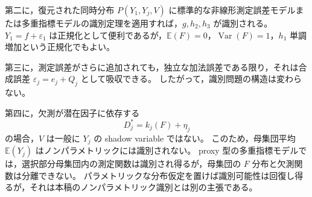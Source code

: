 \documentclass[dvipdfmx,autodetect-engine]{jsarticle}
\newcommand{\E}{\mathbb{E}}
\newcommand{\1}{\mathbf{1}}
\begin{document}
第二に，復元された同時分布 $P(Y_1,Y_j,V)$ に標準的な非線形測定誤差モデルまたは多重指標モデルの識別定理を適用すれば，$g,h_2,h_3$ が識別される。
$Y_1=f+\varepsilon_1$ は正規化として便利であるが，$\E(F)=0$，$\operatorname{Var}(F)=1$，$h_1$ 単調増加という正規化でもよい。

第三に，測定誤差がさらに追加されても，独立な加法誤差である限り，それは合成誤差 $\varepsilon_j=e_j+Q_j$ として吸収できる。
したがって，識別問題の構造は変わらない。

第四に，欠測が潜在因子に依存する
\begin{equation}
  D_j^*=k_j(F)+\eta_j
\end{equation}
の場合，$V$ は一般に $Y_j$ の shadow variable ではない。
このため，母集団平均 $\E(Y_j)$ はノンパラメトリックには識別されない。
proxy 型の多重指標モデルでは，選択部分母集団内の測定関数は識別され得るが，母集団の $F$ 分布と欠測関数は分離できない。
パラメトリックな分布仮定を置けば識別可能性は回復し得るが，それは本稿のノンパラメトリック識別とは別の主張である。
\end{document}
